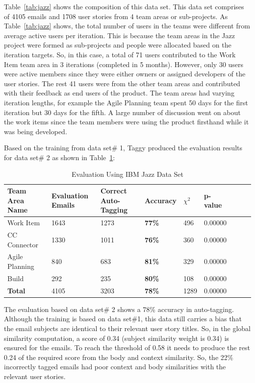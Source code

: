 Table~\ref{tab:jazz} shows the composition of this data set. This data set comprises of 4105 emails and 1708 user stories from 4 team areas or sub-projects. As Table~\ref{tab:jazz} shows, the total number of users in the teams were different from average active users per iteration. This is because the team areas in the Jazz project were formed as sub-projects and people were allocated based on the iteration targets. So, in this case, a total of 71 users contributed to the Work Item team area in 3 iterations (completed in 5 months). However, only 30 users were active members since they were either owners or assigned developers of the user stories. The rest 41 users were from the other team areas and contributed with their feedback as end users of the product. The team areas had varying iteration lengths, for example the Agile Planning team spent 50 days for the first iteration but 30 days for the fifth. A large number of discussion went on about the work items since the team members were using the product firsthand while it was being developed.

Based on the training from data set\# 1, Taggy produced the evaluation results for data set\# 2 as shown in Table~\ref{tab:jazz_evaluation}:

\begin{table}[h!]
  \centering
  \caption{Evaluation Using IBM Jazz Data Set}
	\label{tab:jazz_evaluation}
    \begin{tabular}{|p{2cm}|p{2cm}|p{3cm}|p{2cm}|p{2cm}|p{2cm}|p{2cm}|p{2cm}|p{2cm}}
      \hline
      \textbf{Team Area Name} & \textbf{Evaluation Emails} & \textbf{Correct Auto-Tagging} & \textbf{Accuracy}	& \textbf{$\chi^2$} & \textbf{p-value}\\
      \hline
      Work Item 				& 1643 	 	&	1273 & \textbf{77\%} & 496	& 0.00000\\
      \hline
      CC Connector 			& 1330 			&	1011	& \textbf{76\%} & 360	& 0.00000\\
      \hline
      Agile Planning 		& 840 		 	& 683		& \textbf{81\%} & 329	& 0.00000\\
   		\hline
      Build 						& 292 			&	235		& \textbf{80\%} & 108	& 0.00000\\
      \hline
      \textbf{Total} 		& 4105 				& 3203 	& \textbf{78\%} & 1289	& 0.00000\\
      \hline
    \end{tabular}
\end{table}

The evaluation based on data set\# 2 shows a 78\% accuracy in auto-tagging. Although the training is based on data set\#1, this data still carries a bias that the email subjects are identical to their relevant user story titles. So, in the global similarity computation, a score of 0.34 (subject similarity weight is 0.34) is ensured for the emails. To reach the threshold of 0.58 it needs to produce the rest 0.24 of the required score from the body and context similarity. So, the 22\% incorrectly tagged emails had poor context and body similarities with the relevant user stories.

